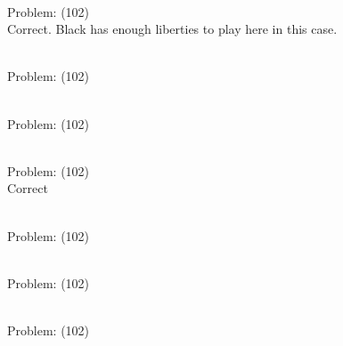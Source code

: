 \documentclass[11pt]{article}
\begin{document}
\begin{minipage}[t]{0.5\textwidth}
  {\centering
  
\\
Problem: (102)\\
Correct. Black has enough liberties to play here in this case.\\
  }
\end{minipage}
\begin{minipage}[t]{0.5\textwidth}
  {\centering
  
\\
Problem: (102)\\
  }
\end{minipage}
\begin{minipage}[t]{0.5\textwidth}
  {\centering
  
\\
Problem: (102)\\
  }
\end{minipage}
\begin{minipage}[t]{0.5\textwidth}
  {\centering
  
\\
Problem: (102)\\
Correct\\
  }
\end{minipage}
\begin{minipage}[t]{0.5\textwidth}
  {\centering
  
\\
Problem: (102)\\
  }
\end{minipage}
\begin{minipage}[t]{0.5\textwidth}
  {\centering
  
\\
Problem: (102)\\
  }
\end{minipage}
\begin{minipage}[t]{0.5\textwidth}
  {\centering
  
\\
Problem: (102)\\
  }
\end{minipage}
\end{document}
